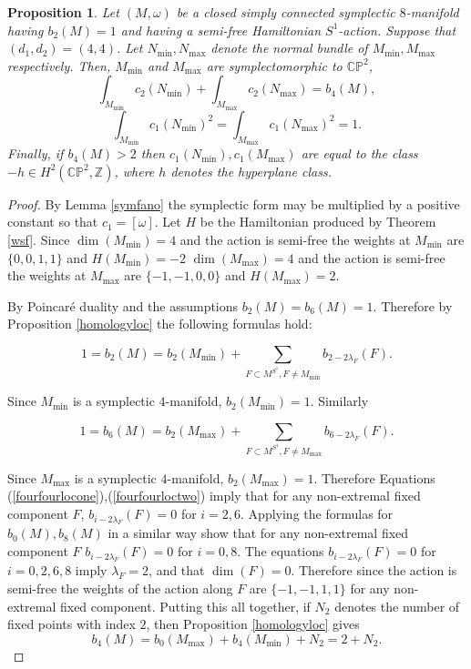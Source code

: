 \documentclass[12pt]{article}
\newtheorem{proposition}[theorem]{Proposition}
\begin{document}
\begin{proposition} \label{fourfourcase}
Let $(M,\omega)$ be a closed simply connected symplectic $8$-manifold having $b_{2}(M)=1$ and having a semi-free Hamiltonian $S^1$-action. Suppose that $(d_1,d_2) = (4,4)$. Let $N_{\min},N_{\max}$ denote the normal bundle of $M_{\min},M_{\max}$ respectively. Then, $M_{\min}$ and $M_{\max}$ are symplectomorphic to $\mathbb{CP}^2$,  $$\int_{M_{\min}} c_{2}(N_{\min}) + \int_{M_{\max}}c_{2}(N_{\max}) =b_{4}(M),$$ $$\int_{M_{\min}} c_{1}(N_{\min})^2 = \int_{M_{\max}} c_{1}(N_{\max})^2 =1.$$ Finally, if $b_{4}(M) > 2$ then $c_{1}(N_{\min}),c_{1}(M_{\max})$ are equal to the class$-h \in H^{2}(\mathbb{CP}^2,\mathbb{Z})$, where $h$ denotes the hyperplane class.
\end{proposition}
\begin{proof} 

By Lemma \ref{symfano} the symplectic form may be multiplied by a positive constant so that $c_1 = [\omega]$. Let $H$ be the Hamiltonian produced by Theorem \ref{wsf}. Since $\dim(M_{\min}) = 4$ and the action is semi-free the weights at $M_{\min}$ are $\{0,0,1,1\}$ and $H(M_{\min}) = -2$ $\dim(M_{\max}) = 4$ and the action is semi-free the weights at $M_{\max}$ are $\{-1,-1,0,0\}$  and $H(M_{\max}) = 2$.

By Poincar\'{e} duality and the assumptions $b_{2}(M)=b_{6}(M)=1$. Therefore by Proposition \ref{homologyloc} the following formulas hold: 

\begin{equation} \label{fourfourlocone}  
1= b_{2}(M) = b_{2}(M_{\min}) +  \sum_{F \subset M^{S^1}, F \neq M_{\min}} b_{2-2\lambda_{F}}(F).  \end{equation}

Since $M_{\min}$ is a symplectic $4$-manifold, $b_{2}(M_{\min})=1$. Similarly


\begin{equation} \label{fourfourloctwo}  
1= b_{6}(M) = b_{2}(M_{\max}) +  \sum_{F \subset M^{S^1}, F \neq M_{\max}} b_{6-2\lambda_{F}}(F).  \end{equation}


Since $M_{\max}$ is a symplectic $4$-manifold, $b_{2}(M_{\max})=1$. Therefore Equations (\ref{fourfourlocone}),(\ref{fourfourloctwo}) imply that for any non-extremal fixed component $F$, $b_{i-2\lambda_{F}}(F) = 0$ for $i=2,6$.  Applying the formulas for $b_{0}(M),b_{8}(M)$ in a similar way show that for any non-extremal fixed component $F$ $b_{i-2\lambda_{F}}(F) = 0$ for $i=0,8$.  The equations  $b_{i-2\lambda_{F}}(F) = 0$ for $i=0,2,6,8$ imply $\lambda_{F}=2$, and that $\dim(F)=0$.  Therefore since the action is semi-free the weights of the action along $F$ are $\{-1,-1,1,1\}$ for any non-extremal fixed component. Putting this all together, if $N_{2}$ denotes the number of fixed points with index $2$, then Proposition \ref{homologyloc} gives 
\begin{equation} \label{fourfourlocthree}  
b_{4}(M) = b_{0}(M_{\max}) + b_{4}(M_{\min}) + N_{2} = 2 +N_{2}.  \end{equation}





\end{proof}
\end{document}

